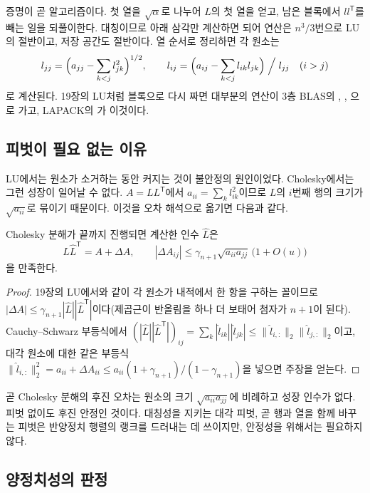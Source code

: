 증명이 곧 알고리즘이다. 첫 열을 $\sqrt{\alpha}$로 나누어 $L$의 첫 열을 얻고, 남은 블록에서 $ll^{\mathsf T}$를 빼는 일을 되풀이한다. 대칭이므로 아래 삼각만 계산하면 되어 연산은 $n^3/3$번으로 LU의 절반이고, 저장 공간도 절반이다. 열 순서로 정리하면 각 원소는
\[
l_{jj}=\Bigl(a_{jj}-\sum_{k<j}l_{jk}^2\Bigr)^{1/2},\qquad l_{ij}=\Bigl(a_{ij}-\sum_{k<j}l_{ik}l_{jk}\Bigr)\Bigm/l_{jj}\quad(i>j)
\]
로 계산된다. 19장의 LU처럼 블록으로 다시 짜면 대부분의 연산이 3층 BLAS의 , , 으로 가고, LAPACK의 가 이것이다.

\subsection{피벗이 필요 없는 이유}

LU에서는 원소가 소거하는 동안 커지는 것이 불안정의 원인이었다. Cholesky에서는 그런 성장이 일어날 수 없다. $A=LL^{\mathsf T}$에서 $a_{ii}=\sum_k l_{ik}^2$이므로 $L$의 $i$번째 행의 크기가 $\sqrt{a_{ii}}$로 묶이기 때문이다. 이것을 오차 해석으로 옮기면 다음과 같다.

\begin{theorem}
\label{thm:cholesky-backward}
Cholesky 분해가 끝까지 진행되면 계산한 인수 $\hat L$은
\[
\hat L\hat L^{\mathsf T}=A+\Delta A,\qquad|\Delta A_{ij}|\le\gamma_{n+1}\sqrt{a_{ii}a_{jj}}\,\bigl(1+O(u)\bigr)
\]
을 만족한다.
\end{theorem}

\begin{proof}
19장의 LU에서와 같이 각 원소가 내적에서 한 항을 구하는 꼴이므로 $|\Delta A|\le\gamma_{n+1}|\hat L||\hat L^{\mathsf T}|$이다(제곱근이 반올림을 하나 더 보태어 첨자가 $n+1$이 된다). Cauchy--Schwarz 부등식에서 $(|\hat L||\hat L^{\mathsf T}|)_{ij}=\sum_k|\hat l_{ik}||\hat l_{jk}|\le\|\hat l_{i,:}\|_2\|\hat l_{j,:}\|_2$이고, 대각 원소에 대한 같은 부등식 $\|\hat l_{i,:}\|_2^2=a_{ii}+\Delta A_{ii}\le a_{ii}(1+\gamma_{n+1})/(1-\gamma_{n+1})$을 넣으면 주장을 얻는다.
\end{proof}

곧 Cholesky 분해의 후진 오차는 원소의 크기 $\sqrt{a_{ii}a_{jj}}$에 비례하고 성장 인수가 없다. 피벗 없이도 후진 안정인 것이다. 대칭성을 지키는 대각 피벗, 곧 행과 열을 함께 바꾸는 피벗은 반양정치 행렬의 랭크를 드러내는 데 쓰이지만, 안정성을 위해서는 필요하지 않다.

\subsection{양정치성의 판정}

